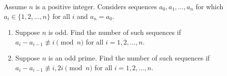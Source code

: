 Assume $n$ is a positive integer. Considers sequences $a_0, a_1, \ldots, a_n$ for which $a_i \in \{1, 2, \ldots , n\}$ for all $i$ and $a_n = a_0$. 
\begin{enumerate}[label=(\alph*)]
	\item Suppose $n$ is odd. Find the number of such sequences if $a_i - a_{i-1} \not \equiv i \pmod{n}$ for all $i = 1, 2, \ldots, n$.
	\item Suppose $n$ is an odd prime. Find the number of such sequences if $a_i - a_{i-1} \not \equiv i, 2i \pmod{n}$ for all $i = 1, 2, \ldots, n$.
\end{enumerate}